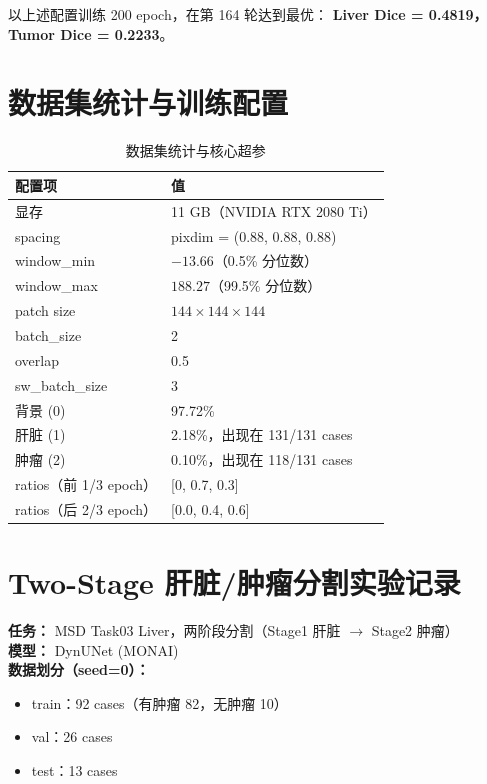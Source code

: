 \documentclass{article}
\begin{document}
	以上述配置训练 200 epoch，在第 164 轮达到最优：
	\textbf{Liver Dice = 0.4819，Tumor Dice = 0.2233}。
	
	\section{数据集统计与训练配置}
	
	\begin{table}[H]
		\centering
		\caption{数据集统计与核心超参}
		\begin{tabular}{ll}
			\hline
			\textbf{配置项} & \textbf{值} \\
			\hline
			显存            & 11 GB（NVIDIA RTX 2080 Ti） \\
			spacing         & pixdim = (0.88, 0.88, 0.88) \\
			window\_min     & $-13.66$（0.5\% 分位数） \\
			window\_max     & $188.27$（99.5\% 分位数） \\
			patch size      & $144\times144\times144$ \\
			batch\_size     & 2 \\
			overlap         & 0.5 \\
			sw\_batch\_size & 3 \\
			\hline
			背景 (0)        & 97.72\% \\
			肝脏 (1)        & 2.18\%，出现在 131/131 cases \\
			肿瘤 (2)        & 0.10\%，出现在 118/131 cases \\
			\hline
			ratios（前 1/3 epoch） & [0, 0.7, 0.3] \\
			ratios（后 2/3 epoch） & [0.0, 0.4, 0.6] \\
			\hline
		\end{tabular}
	\end{table}
	
	\section{Two-Stage 肝脏/肿瘤分割实验记录}
	
	\noindent\textbf{任务：} MSD Task03 Liver，两阶段分割（Stage1 肝脏 $\rightarrow$ Stage2 肿瘤）\\
	\textbf{模型：} DynUNet (MONAI)\\
	\textbf{数据划分（seed=0）：}
	\begin{itemize}
		\item train：92 cases（有肿瘤 82，无肿瘤 10）
		\item val：26 cases
		\item test：13 cases
	\end{itemize}
	
\end{document}
